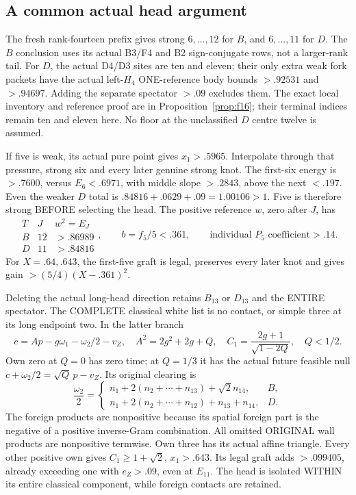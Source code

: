 \documentclass[11pt]{article}
\begin{document}
\subsection{A common actual head argument}
\label{app:arithBD14typedhead}

The fresh rank-fourteen prefix gives strong
\(6,\ldots,12\) for \(B\), and \(6,\ldots,11\)
for \(D\).
The \(B\) conclusion uses its actual B3/F4 and
B2 sign-conjugate rows, not a larger-rank tail.
For \(D\), the actual D4/D3 sites are ten and eleven;
their only extra weak fork packets have the actual
left-\(H_4\) ONE-reference body bounds
\(>.92531\) and \(>.94697\).
Adding the separate spectator \(>.09\) excludes them.
The exact local inventory and reference proof are
in Proposition~\ref{prop:f16}; their terminal
indices remain ten and eleven here.
No floor at the unclassified \(D\) centre twelve
is assumed.

If five is weak, its actual pure point gives
\(x_1>.5965\).
Interpolate through that pressure, strong six and
every later genuine strong knot.
The first-six energy is \(>.7600\), versus \(E_6<.6971\),
with middle slope \(>.2843\), above the next \(<.197\).
Even the weaker \(D\) total is
\(.84816+.0629+.09=1.00106>1\).
Five is therefore strong BEFORE selecting the head.
The positive reference \(w\), zero after \(J\), has
\[
 \begin{array}{c|c|c}
 T&J&w^2=E_J\\ \hline
 B&12&>.86989\\
 D&11&>.84816
 \end{array},
 \qquad b=f_5/5<.361,\qquad
 \text{individual }P_5\text{ coefficient}>.14 .
\]
For \(X=.64,.643\), the first-five graft is legal,
preserves every later knot and gives gain
\(>(5/4)(X-.361)^2\).

Deleting the actual long-head direction retains
\(B_{13}\) or \(D_{13}\) and the ENTIRE spectator.
The COMPLETE classical white list is no contact,
or simple three at its long endpoint two.
In the latter branch
\[
 c=Ap-g\omega_1-\omega_2/2-v_Z,\quad
 A^2=2g^2+2g+Q,\quad
 C_1={\frac{2g+1}{\sqrt{1-2Q}}},\quad Q<1/2 .
\]
Own zero at \(Q=0\) has zero time;
at \(Q=1/3\) it has the actual future feasible null
\(c+\omega_2/2=\sqrt Q\,p-v_Z\).
Its original clearing is
\[
 {\frac{\omega_2}{2}}=
 \begin{cases}
 n_1+2(n_2+\cdots+n_{13})+\sqrt2n_{14},&B,\\
 n_1+2(n_2+\cdots+n_{12})+n_{13}+n_{14},&D .
 \end{cases}
\]
The foreign products are nonpositive because its
spatial foreign part is the negative of a positive
inverse-Gram combination.
All omitted ORIGINAL wall products are nonpositive
termwise.
Own three has its actual affine triangle.
Every other positive own gives
\(C_1\ge1+\sqrt2\), \(x_1>.643\).
Its legal graft adds \(>.099405\), already exceeding
one with \(e_Z>.09\), even at \(E_{11}\).
The head is isolated WITHIN its entire classical
component, while foreign contacts are retained.
\end{document}
